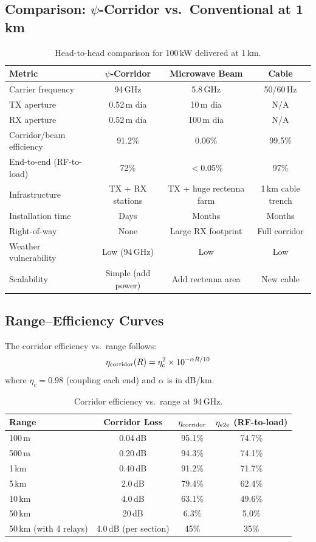 \documentclass[11pt,a4paper]{article}
\begin{document}
\subsection{Comparison: $\psi$-Corridor vs.\ Conventional at 1\,km}

\begin{table}[h]
\centering
\caption{Head-to-head comparison for 100\,kW delivered at 1\,km.}
\begin{tabular}{lccc}
\toprule
Metric & $\psi$-Corridor & Microwave Beam & Cable \\
\midrule
Carrier frequency & 94\,GHz & 5.8\,GHz & 50/60\,Hz \\
TX aperture & 0.52\,m dia & 10\,m dia & N/A \\
RX aperture & 0.52\,m dia & 100\,m dia & N/A \\
Corridor/beam efficiency & 91.2\% & 0.06\% & 99.5\% \\
End-to-end (RF-to-load) & 72\% & $<$0.05\% & 97\% \\
Infrastructure & TX + RX stations & TX + huge rectenna farm & 1\,km cable trench \\
Installation time & Days & Months & Months \\
Right-of-way & None & Large RX footprint & Full corridor \\
Weather vulnerability & Low (94\,GHz) & Low & Low \\
Scalability & Simple (add power) & Add rectenna area & New cable \\
\bottomrule
\end{tabular}
\end{table}

\subsection{Range--Efficiency Curves}

The corridor efficiency vs.\ range follows:
\begin{equation}
\eta_{\rm corridor}(R) = \eta_{\rm c}^2 \times 10^{-\alpha R/10}
\end{equation}
where $\eta_c = 0.98$ (coupling each end) and $\alpha$ is in dB/km.

\begin{table}[h]
\centering
\caption{Corridor efficiency vs.\ range at 94\,GHz.}
\begin{tabular}{lccc}
\toprule
Range & Corridor Loss & $\eta_{\rm corridor}$ & $\eta_{\rm e2e}$ (RF-to-load) \\
\midrule
100\,m & 0.04\,dB & 95.1\% & 74.7\% \\
500\,m & 0.20\,dB & 94.3\% & 74.1\% \\
1\,km & 0.40\,dB & 91.2\% & 71.7\% \\
5\,km & 2.0\,dB & 79.4\% & 62.4\% \\
10\,km & 4.0\,dB & 63.1\% & 49.6\% \\
50\,km & 20\,dB & 6.3\% & 5.0\% \\
50\,km (with 4 relays) & 4.0\,dB (per section) & 45\% & 35\% \\
\bottomrule
\end{tabular}
\end{table}
\end{document}
